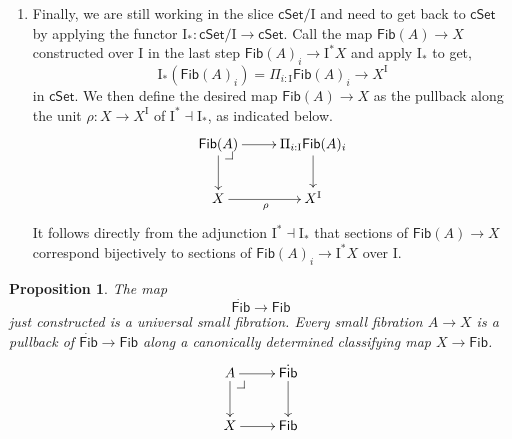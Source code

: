 \documentclass[12pt]{article}
\makeatletter
\newcommand{\cSet}{\ensuremath{\mathsf{cSet}}}
\newcommand{\pbcorner}[1][dr]{\save*!/#1-1.2pc/#1:(-1,1)@^{|-}\restore}
\newcommand{\ra}{\ensuremath{\rightarrow}}
\newcommand{\I}{\ensuremath{\mathrm{I}}}
\newcommand{\Fib}{\ensuremath{\mathsf{Fib}}}
\newcommand{\FFib}{\ensuremath{\dot{\mathsf{Fib}}}}
\newtheorem{proposition}[theorem]{Proposition}
\theoremstyle{remark}
\theoremstyle{definition}
\makeatother
\begin{document}
\begin{enumerate}
\item\label{item:laststep} Finally, we are still working in the slice $\cSet/\I$ and need to get back to $\cSet$ by applying the functor $\I_*: \cSet/\I \ra \cSet$.  Call the map $\Fib(A)\ra X$ constructed over $\I$ in the last step $\Fib(A)_i \ra \I^{*}X$ and apply $\I_*$ to get,
\[
\I_*(\Fib(A)_i) = \Pi_{i:\I}\Fib(A)_i \ra X^\I
\]
in $\cSet$.  We then define the desired map $\Fib(A)\ra X$ as the pullback along the unit $\rho : X \ra X^\I$ of  $\I^*\dashv \I_*$, as indicated below.
\begin{equation}\label{diagram:fibU7}
\xymatrix{
 \Fib(A) \ar[d] \ar[r] \pbcorner & \ar[d] \Pi_{i:\I}\Fib(A)_i \\
 X \ar[r]_{\rho} &  X^\I
}
\end{equation}
It follows directly from the adjunction $\I^*\dashv \I_*$ that sections of $\Fib(A)\ra X$ correspond bijectively to sections of $\Fib(A)_i \ra \I^{*}X$ over $\I$.
\end{enumerate}


\begin{proposition}\label{prop:UniversalFib}
The map $$\FFib\ra\Fib$$ just constructed is a \emph{universal small fibration}.    Every small fibration $A \ra X$ is a pullback of $\FFib\ra\Fib$ along a canonically determined classifying map $X\ra \Fib$.
\begin{equation}\label{diagram:classifyfib}
\xymatrix{
A \ar[d] \ar[r]  \pbcorner & \FFib\ar[d]\\
X \ar[r] & \Fib
}
\end{equation}
\end{proposition}
\end{document}
